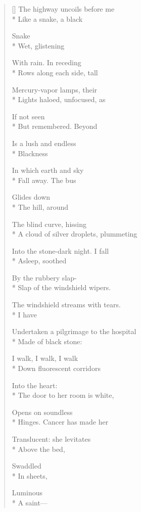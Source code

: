 \label{ch:notime}
\settowidth{\versewidth}{To the black hills coiled by the roadside, the}
\begin{verse}[\versewidth]
The highway uncoils before me\\*
Like a snake, a black

Snake\\*
Wet, glistening

With rain. \quad In receding\\*
Rows along each side, tall

Mercury-vapor lamps, their\\*
Lights haloed, unfocused, as

If not seen\\*
But remembered. \quad Beyond

Is a lush and endless\\*
Blackness

In which earth and sky\\*
Fall away. \quad The bus

Glides down\\*
The hill, around

The blind curve, hissing\\*
A cloud of silver droplets, plummeting

Into the stone-dark night. \quad I fall\\*
Asleep, soothed

By the rubbery slap-\\*
Slap of the windshield wipers.

The windshield streams with tears.\\*
I have

Undertaken a pilgrimage to the hospital\\*
Made of black stone:

I walk, I walk, I walk\\*
Down fluorescent corridors

Into the heart:\\*
The door to her room is white,

Opens on soundless\\*
Hinges. \quad Cancer has made her

Translucent: she levitates\\*
Above the bed,

Swaddled\\*
In sheets,

Luminous\\*
A saint---


\end{verse}
